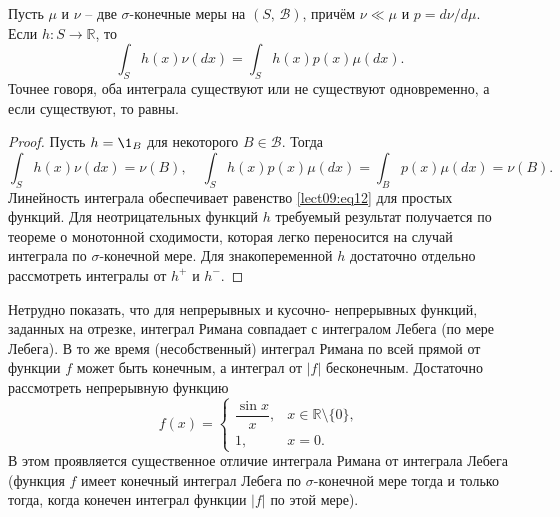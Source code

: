 \begin{theorem}\label{lect09:th2}
Пусть $\mu$ и $\nu$ -- две $\sigma$-конечные меры на $(S,\,\mathcal{B})$, причём $\nu\ll\mu$ и $p=d\nu/d\mu$. Если $h\colon S\to\mathbb{R}$, то
\begin{equation}\label{lect09:eq12}
\int_Sh(x)\nu(dx)=\int_Sh(x)p(x)\mu(dx).
\end{equation}
Точнее говоря, оба интеграла существуют или не существуют одновременно, а если существуют, то равны.
\end{theorem}
\begin{proof}
Пусть $h=\1_B$ для некоторого $B\in\mathcal{B}$. Тогда
\[ \int_Sh(x)\nu(dx)=\nu(B),\quad\int_Sh(x)p(x)\mu(dx)=\int_Bp(x)\mu(dx)=\nu(B). \]
Линейность интеграла обеспечивает равенство \ref{lect09:eq12} для простых функций. Для неотрицательных функций $h$ требуемый результат получается по теореме о монотонной сходимости, которая легко переносится на случай интеграла по $\sigma$-конечной мере. Для знакопеременной $h$ достаточно отдельно рассмотреть интегралы от $h^+$ и $h^-$.
\end{proof}

\begin{nb}\label{lect09:nb1}
Нетрудно показать, что для непрерывных и кусочно- непрерывных функций, заданных на отрезке, интеграл Римана совпадает с интегралом Лебега (по мере Лебега). В то же время (несобственный) интеграл Римана по всей прямой от функции $f$ может быть конечным, а интеграл от $|f|$ бесконечным. Достаточно рассмотреть непрерывную функцию
\[ 
f(x)=
\begin{cases}
\dfrac{\sin{x}}{x},&x\in\mathbb{R}\setminus\{0\},\\
1,&x=0.
\end{cases}
\]
В этом проявляется существенное отличие интеграла Римана от интеграла Лебега (функция $f$ имеет конечный интеграл Лебега по $\sigma$-конечной мере тогда и только тогда, когда конечен интеграл функции $|f|$ по этой мере).
\end{nb}

